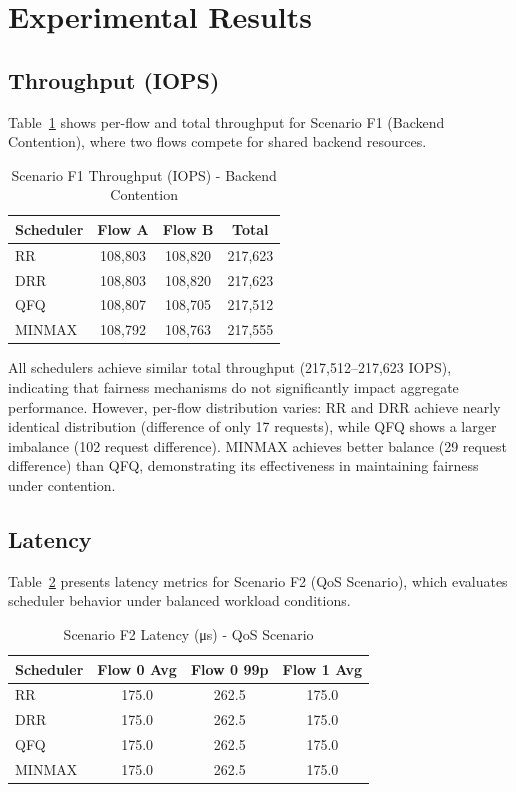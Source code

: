\documentclass[11pt]{article}
\begin{document}
\section{Experimental Results}

\subsection{Throughput (IOPS)}

Table~\ref{tab:f1-throughput} shows per-flow and total throughput for Scenario F1 (Backend Contention), where two flows compete for shared backend resources.

\begin{table}[h]
\centering
\caption{Scenario F1 Throughput (IOPS) - Backend Contention}
\label{tab:f1-throughput}
\begin{tabular}{lccc}
\toprule
Scheduler & Flow A & Flow B & Total \\
\midrule
RR   & 108,803 & 108,820 & 217,623 \\
DRR  & 108,803 & 108,820 & 217,623 \\
QFQ  & 108,807 & 108,705 & 217,512 \\
MINMAX & 108,792 & 108,763 & 217,555 \\
\bottomrule
\end{tabular}
\end{table}

All schedulers achieve similar total throughput (217,512--217,623 IOPS), indicating that fairness mechanisms do not significantly impact aggregate performance. However, per-flow distribution varies: RR and DRR achieve nearly identical distribution (difference of only 17 requests), while QFQ shows a larger imbalance (102 request difference). MINMAX achieves better balance (29 request difference) than QFQ, demonstrating its effectiveness in maintaining fairness under contention.

\subsection{Latency}

Table~\ref{tab:f2-latency} presents latency metrics for Scenario F2 (QoS Scenario), which evaluates scheduler behavior under balanced workload conditions.

\begin{table}[h]
\centering
\caption{Scenario F2 Latency (\si{\micro\second}) - QoS Scenario}
\label{tab:f2-latency}
\begin{tabular}{lccc}
\toprule
Scheduler & Flow 0 Avg & Flow 0 99p & Flow 1 Avg \\
\midrule
RR   & 175.0 & 262.5 & 175.0 \\
DRR  & 175.0 & 262.5 & 175.0 \\
QFQ  & 175.0 & 262.5 & 175.0 \\
MINMAX & 175.0 & 262.5 & 175.0 \\
\bottomrule
\end{tabular}
\end{table}
\end{document}

